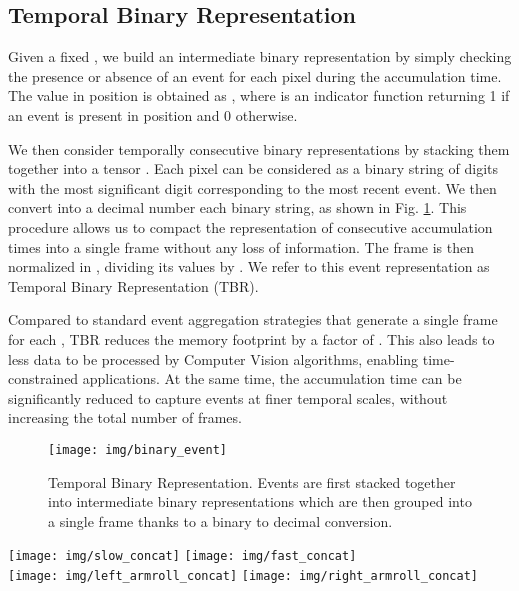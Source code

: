 \documentclass[a4paper,conference]{IEEEtran}
\begin{document}
\subsection{Temporal Binary Representation}
Given a fixed , we build an intermediate binary representation  by simply checking the presence or absence of an event for each pixel during the accumulation time. The value in position  is obtained as , where  is an indicator function returning 1 if an event is present in position  and 0 otherwise.

We then consider  temporally consecutive binary representations by stacking them together into a tensor . Each pixel can be considered as a binary string of  digits  with the most significant digit corresponding to the most recent event. We then convert into a decimal number each binary string, as shown in Fig. \ref{fig:binaryevent}. This procedure allows us to compact the representation of  consecutive accumulation times into a single frame without any loss of information. The frame is then normalized in , dividing its values by .
We refer to this event representation as Temporal Binary Representation (TBR).

Compared to standard event aggregation strategies that generate a single frame for each , TBR reduces the memory footprint by a factor of . This also leads to less data to be processed by Computer Vision algorithms, enabling time-constrained applications. At the same time, the accumulation time can be significantly reduced to capture events at finer temporal scales, without increasing the total number of frames.

\begin{figure}[!t]
	\centering
	\texttt{[image: img/binary\_event]}
	\caption{Temporal Binary Representation. Events are first stacked together into intermediate binary representations which are then grouped into a single frame thanks to a binary to decimal conversion.}
	\label{fig:binaryevent}
\end{figure}

\begin{figure*}[t]
	\centering
	\texttt{[image: img/slow\_concat]}
	\texttt{[image: img/fast\_concat]}\\
	\texttt{[image: img/left\_armroll\_concat]}
	\texttt{[image: img/right\_armroll\_concat]}\\
	\caption{Samples from the MICC-Event Gesture Dataset. Slow and fast execution of the action \textit{air drum} (first row) and different scale and orientation of the action \textit{arm roll} (second row). A 1 second snippet is shown for each sample, where events are color-coded according to the timestamps from blue (start - 0s) to yellow (end - 1s). The actors are shown both frontal (left) and sideways (right).}
	\label{fig:recordings}
\end{figure*}
\end{document}
